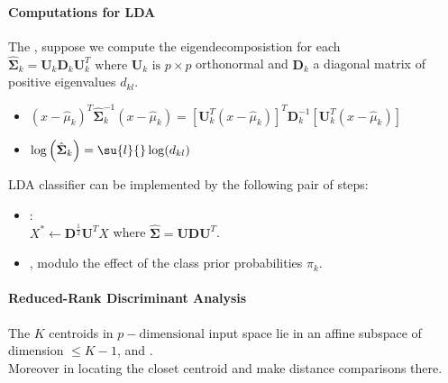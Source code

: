 \paragraph{Computations for LDA}
The , suppose we compute the eigendecomposistion for each
$\hat{\bm{\Sigma}}_{k} = \bm{U}_{k}\bm{D}_{k}\bm{U}_{k}^{T}\text{ where } \bm{U}_{k}\text{ is }
p\times p$ orthonormal and $\bm{D}_{k}$ a diagonal matrix of positive eigenvalues $d_{kl}$.
\begin{itemize}
	\item $(x-\hat{\mu}_{k})^{T}\hat{\bm{\Sigma}}^{-1}_{k}(x-\hat{\mu}_{k}) =
		\left[ \bm{U}_{k}^{T}(x-\hat{\mu}_{k}) \right]^{T}\bm{D}_{k}^{-1}
		\left[ \bm{U}_{k}^{T}(x-\hat{\mu}_{k}) \right]$
	\item $\log\left( \hat{\bm{\Sigma}}_{k} \right) = \su{l}{}\log(d_{kl})$
\end{itemize}
LDA classifier can be implemented by the following pair of steps:
\begin{itemize}
	\item {}:\\ $X^{*} \leftarrow \bm{D}^{\frac{1}{2}}\bm{U}^{T}X$ where $\hat{\bm{\Sigma}} = \bm{U}\bm{D}\bm{U}^{T}$. 
	\item {}, modulo the effect
		of the class prior probabilities $\pi_{k}$.
\end{itemize}

\paragraph{Reduced-Rank Discriminant Analysis}
The $K$ centroids in $p-\text{dimensional}$ input space lie in an affine subspace of dimension
$\leq K-1$, and .\\
Moreover in locating the closet centroid  and make distance comparisons there.

